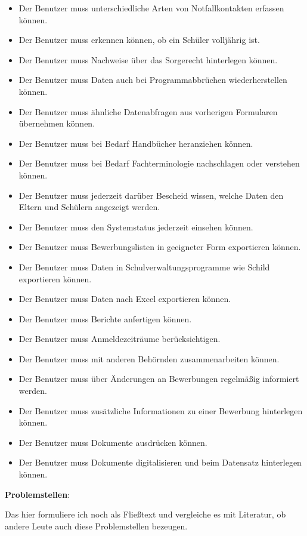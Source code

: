 \begin{itemize}
     \item Der Benutzer muss unterschiedliche Arten von Notfallkontakten erfassen können.
     \item Der Benutzer muss erkennen können, ob ein Schüler volljährig ist.
     \item Der Benutzer muss Nachweise über das Sorgerecht hinterlegen können.
     \item Der Benutzer muss Daten auch bei Programmabbrüchen wiederherstellen können.
     \item Der Benutzer muss ähnliche Datenabfragen aus vorherigen Formularen übernehmen können.
     \item Der Benutzer muss bei Bedarf Handbücher heranziehen können.
     \item Der Benutzer muss bei Bedarf Fachterminologie nachschlagen oder verstehen können.
     \item Der Benutzer muss jederzeit darüber Bescheid wissen, welche Daten den Eltern und Schülern angezeigt werden.
     \item Der Benutzer muss den Systemstatus jederzeit einsehen können.
     \item Der Benutzer muss Bewerbungslisten in geeigneter Form exportieren können.
     \item Der Benutzer muss Daten in Schulverwaltungsprogramme wie Schild exportieren können.
     \item Der Benutzer muss Daten nach Excel exportieren können.
     \item Der Benutzer muss Berichte anfertigen können.
     \item Der Benutzer muss Anmeldezeiträume berücksichtigen.
     \item Der Benutzer muss mit anderen Behörnden zusammenarbeiten können.
     \item Der Benutzer muss über Änderungen an Bewerbungen regelmäßig informiert werden.
     \item Der Benutzer muss zusätzliche Informationen zu einer Bewerbung hinterlegen können.
     \item Der Benutzer muss Dokumente ausdrücken können.
     \item Der Benutzer muss Dokumente digitalisieren und beim Datensatz hinterlegen können.
\end{itemize}

\textbf{Problemstellen}:

Das hier formuliere ich noch als Fließtext und vergleiche es mit Literatur, ob andere Leute auch diese Problemstellen bezeugen.

